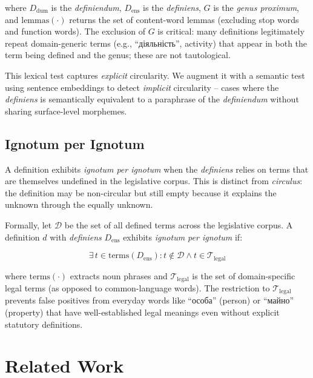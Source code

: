 \documentclass[11pt]{article}
\begin{document}
\noindent where $D_{\text{dum}}$ is the \emph{definiendum}, $D_{\text{ens}}$ is the \emph{definiens}, $G$ is the \emph{genus proximum}, and $\text{lemmas}(\cdot)$ returns the set of content-word lemmas (excluding stop words and function words).
The exclusion of $G$ is critical: many definitions legitimately repeat domain-generic terms (e.g., \foreignlanguage{ukrainian}{``діяльність''}, activity) that appear in both the term being defined and the genus; these are not tautological.

This lexical test captures \emph{explicit} circularity.
We augment it with a semantic test using sentence embeddings to detect \emph{implicit} circularity -- cases where the \emph{definiens} is semantically equivalent to a paraphrase of the \emph{definiendum} without sharing surface-level morphemes.

\subsection{Ignotum per Ignotum}
\label{sec:ignotum-def}

A definition exhibits \emph{ignotum per ignotum} when the \emph{definiens} relies on terms that are themselves undefined in the legislative corpus.
This is distinct from \emph{circulus}: the definition may be non-circular but still empty because it explains the unknown through the equally unknown.

Formally, let $\mathcal{D}$ be the set of all defined terms across the legislative corpus.
A definition $d$ with \emph{definiens} $D_{\text{ens}}$ exhibits \emph{ignotum per ignotum} if:

\begin{equation}
\label{eq:ignotum}
\exists\, t \in \text{terms}(D_{\text{ens}}) : t \notin \mathcal{D} \land t \in \mathcal{T}_{\text{legal}}
\end{equation}

\noindent where $\text{terms}(\cdot)$ extracts noun phrases and $\mathcal{T}_{\text{legal}}$ is the set of domain-specific legal terms (as opposed to common-language words).
The restriction to $\mathcal{T}_{\text{legal}}$ prevents false positives from everyday words like \foreignlanguage{ukrainian}{``особа''} (person) or \foreignlanguage{ukrainian}{``майно''} (property) that have well-established legal meanings even without explicit statutory definitions.

\section{Related Work}
\label{sec:related}
\end{document}

